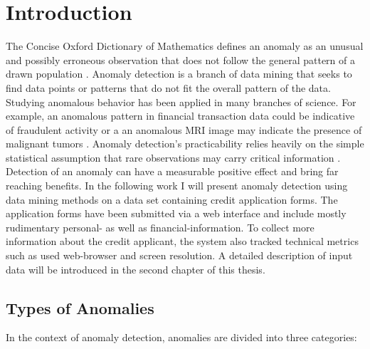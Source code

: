 
\chapter{Introduction}

The Concise Oxford Dictionary of Mathematics defines an anomaly as an unusual and possibly erroneous observation that does not follow the general pattern of a drawn population \cite{Clapham:2013}. Anomaly detection is a branch of data mining that seeks to find data points or patterns that do not fit the overall pattern of the data. Studying anomalous behavior has been applied in many branches of science. For example, an anomalous pattern in financial transaction data could be indicative of fraudulent activity or a an anomalous MRI image may indicate the presence of malignant tumors \cite{Spence:2001:DSC:882464.882797}. Anomaly detection's practicability relies heavily on the simple statistical assumption that rare observations may carry critical information \cite{Chandola:2009:ADS:1541880.1541882}. Detection of an anomaly can have a measurable positive effect and bring far reaching benefits. In the following work I will present anomaly detection using data mining methods on a data set containing credit application forms. The application forms have been submitted via a web interface and include mostly rudimentary personal- as well as financial-information. To collect more information about the credit applicant, the system also tracked technical metrics such as used web-browser and screen resolution. A detailed description of input data will be introduced in the second chapter of this thesis.


\section{Types of Anomalies}

In the context of anomaly detection, anomalies are divided into three categories:

